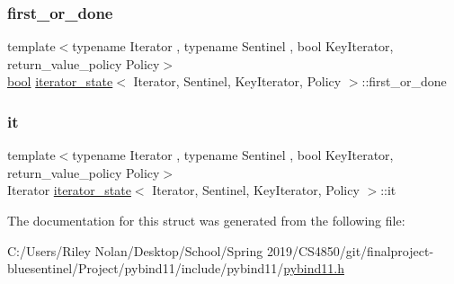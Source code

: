 \mbox{\label{structiterator__state_a466f9a59dcdaefb00103814afbe8fae7}} 
\subsubsection{\texorpdfstring{first\_or\_done}{first\_or\_done}}
{\footnotesize\ttfamily template$<$typename Iterator , typename Sentinel , bool Key\+Iterator, return\+\_\+value\+\_\+policy Policy$>$ \\
\mbox{\hyperlink{asdl_8h_af6a258d8f3ee5206d682d799316314b1}{bool}} \mbox{\hyperlink{structiterator__state}{iterator\+\_\+state}}$<$ Iterator, Sentinel, Key\+Iterator, Policy $>$\+::first\+\_\+or\+\_\+done}

\mbox{\label{structiterator__state_a0d013710bcb43a9d705d82d30fa37aea}} 
\subsubsection{\texorpdfstring{it}{it}}
{\footnotesize\ttfamily template$<$typename Iterator , typename Sentinel , bool Key\+Iterator, return\+\_\+value\+\_\+policy Policy$>$ \\
Iterator \mbox{\hyperlink{structiterator__state}{iterator\+\_\+state}}$<$ Iterator, Sentinel, Key\+Iterator, Policy $>$\+::it}



The documentation for this struct was generated from the following file\+:\begin{DoxyCompactItemize}
\item 
C\+:/\+Users/\+Riley Nolan/\+Desktop/\+School/\+Spring 2019/\+C\+S4850/git/finalproject-\/bluesentinel/\+Project/pybind11/include/pybind11/\mbox{\hyperlink{pybind11_8h}{pybind11.\+h}}\end{DoxyCompactItemize}
